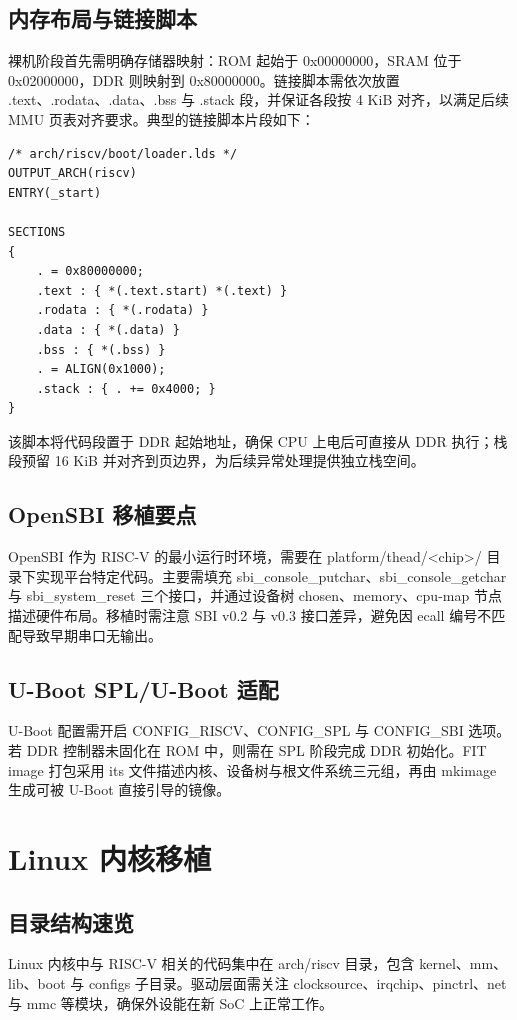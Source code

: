 \section{内存布局与链接脚本}
裸机阶段首先需明确存储器映射：ROM 起始于 0x00000000，SRAM 位于 0x02000000，DDR 则映射到 0x80000000。链接脚本需依次放置 .text、.rodata、.data、.bss 与 .stack 段，并保证各段按 4 KiB 对齐，以满足后续 MMU 页表对齐要求。典型的链接脚本片段如下：\par
\begin{lstlisting}[language=ld]
/* arch/riscv/boot/loader.lds */
OUTPUT_ARCH(riscv)
ENTRY(_start)

SECTIONS
{
    . = 0x80000000;
    .text : { *(.text.start) *(.text) }
    .rodata : { *(.rodata) }
    .data : { *(.data) }
    .bss : { *(.bss) }
    . = ALIGN(0x1000);
    .stack : { . += 0x4000; }
}
\end{lstlisting}
该脚本将代码段置于 DDR 起始地址，确保 CPU 上电后可直接从 DDR 执行；栈段预留 16 KiB 并对齐到页边界，为后续异常处理提供独立栈空间。\par
\section{OpenSBI 移植要点}
OpenSBI 作为 RISC-V 的最小运行时环境，需要在 platform/thead/<chip>/ 目录下实现平台特定代码。主要需填充 sbi\_{}console\_{}putchar、sbi\_{}console\_{}getchar 与 sbi\_{}system\_{}reset 三个接口，并通过设备树 chosen、memory、cpu-map 节点描述硬件布局。移植时需注意 SBI v0.2 与 v0.3 接口差异，避免因 ecall 编号不匹配导致早期串口无输出。\par
\section{U-Boot SPL/U-Boot 适配}
U-Boot 配置需开启 CONFIG\_{}RISCV、CONFIG\_{}SPL 与 CONFIG\_{}SBI 选项。若 DDR 控制器未固化在 ROM 中，则需在 SPL 阶段完成 DDR 初始化。FIT image 打包采用 its 文件描述内核、设备树与根文件系统三元组，再由 mkimage 生成可被 U-Boot 直接引导的镜像。\par
\chapter{Linux 内核移植}
\section{目录结构速览}
Linux 内核中与 RISC-V 相关的代码集中在 arch/riscv 目录，包含 kernel、mm、lib、boot 与 configs 子目录。驱动层面需关注 clocksource、irqchip、pinctrl、net 与 mmc 等模块，确保外设能在新 SoC 上正常工作。\par

